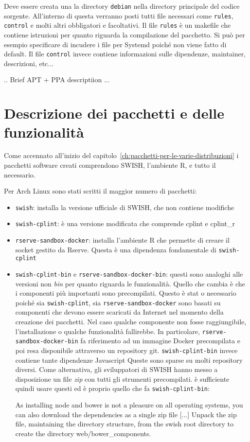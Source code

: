 \documentclass[10pt,titlepage,twoside,a4paper]{report}
\begin{document}
Deve essere creata una la directory \texttt{debian} nella directory principale 
del codice sorgente. All'interno di questa verranno posti tutti file 
necessari come \texttt{rules}, \texttt{control} e molti altri obbligatori e 
facoltativi. Il file \texttt{rules} è un makefile che contiene istruzioni per 
quanto riguarda la compilazione del pacchetto. Si può per esempio specificare 
di incudere i file per Systemd poiché non viene fatto di default. Il file 
\texttt{control} invece contiene informazioni sulle dipendenze, maintainer, 
descrizioni, etc... 

.. Brief APT + PPA descriptiion ...


\section{Descrizione dei pacchetti e delle funzionalità}
Come accennato all'inizio del capitolo~\ref{ch:pacchetti-per-le-varie-distribuzioni}
i pacchetti software creati comprendono SWISH, l'ambiente R, e tutto il 
necessario.

Per Arch Linux sono stati scritti il maggior numero di pacchetti:
\begin{itemize}
    \item \texttt{swish}: installa la versione ufficiale di SWISH, che non 
contiene modifiche
    \item \texttt{swish-cplint}: è una versione modificata che comprende 
cplint e cplint\_r
    \item \texttt{rserve-sandbox-docker}: installa l'ambiente R che permette di 
creare il socket gestito da Rserve. Questa è una dipendenza fondamentale di 
\texttt{swish-cplint}
    \item \texttt{swish-cplint-bin} e \texttt{rserve-sandbox-docker-bin}: 
questi sono analoghi alle versioni non \emph{bin} per quanto riguarda le 
funzionalità. Quello che cambia è che i componenti più importanti sono 
precompilati. Questo è stat o necessario poiché sia \texttt{swish-cplint}, 
sia \texttt{rserve-sandbox-docker} sono basati su componenti che devono essere 
scaricati da Internet nel momento della creazione dei pacchetti. Nel caso 
qualche componente non fosse raggiungibile, l'installazione o qualche 
funzionalità fallirebbe. In particolare, \texttt{rserve-sandbox-docker-bin} 
fa riferimento ad un immagine Docker precompilata e poi resa disponibile 
attraverso un repository git. \texttt{swish-cplint-bin} invece contiene tante 
dipendenze Javascript\cite{javascriptDepsSWISH} Queste sono sparse su molti 
repository diversi. Come alternativa, gli sviluppatori 
di SWISH hanno messo a disposizione un file \emph{zip}\cite{SWISHwebDepsZip} 
con tutti gli strumenti precompilati. è sufficiente quindi usare questi ed 
è proprio quello che fa \texttt{swish-cplint-bin}:
\begin{displayquote}
[...]
As installing node and bower is not a pleasure on all operating systems,
you can also download the dependencies as a single zip file [...]
Unpack the zip file, maintaining the directory structure, from the swish
root directory to create the directory web/bower\_components.
\end{displayquote}
\end{itemize}
\end{document}
